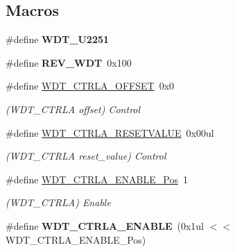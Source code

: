 \subsection*{Macros}
\begin{DoxyCompactItemize}
\item 
\hypertarget{group___s_a_m_l21___w_d_t_ga777d5ca95999852898b8a28793a13b68}{}\#define {\bfseries W\+D\+T\+\_\+\+U2251}\label{group___s_a_m_l21___w_d_t_ga777d5ca95999852898b8a28793a13b68}

\item 
\hypertarget{group___s_a_m_l21___w_d_t_ga2a81abc78d42c7d555d128b152388248}{}\#define {\bfseries R\+E\+V\+\_\+\+W\+D\+T}~0x100\label{group___s_a_m_l21___w_d_t_ga2a81abc78d42c7d555d128b152388248}

\item 
\hypertarget{group___s_a_m_l21___w_d_t_ga03570806578a653a7b3f4ef9588a21a3}{}\#define \hyperlink{group___s_a_m_l21___w_d_t_ga03570806578a653a7b3f4ef9588a21a3}{W\+D\+T\+\_\+\+C\+T\+R\+L\+A\+\_\+\+O\+F\+F\+S\+E\+T}~0x0\label{group___s_a_m_l21___w_d_t_ga03570806578a653a7b3f4ef9588a21a3}

\begin{DoxyCompactList}\small\item\em (W\+D\+T\+\_\+\+C\+T\+R\+L\+A offset) Control \end{DoxyCompactList}\item 
\hypertarget{group___s_a_m_l21___w_d_t_ga6c0fe1613fd8c8330c2da90121786102}{}\#define \hyperlink{group___s_a_m_l21___w_d_t_ga6c0fe1613fd8c8330c2da90121786102}{W\+D\+T\+\_\+\+C\+T\+R\+L\+A\+\_\+\+R\+E\+S\+E\+T\+V\+A\+L\+U\+E}~0x00ul\label{group___s_a_m_l21___w_d_t_ga6c0fe1613fd8c8330c2da90121786102}

\begin{DoxyCompactList}\small\item\em (W\+D\+T\+\_\+\+C\+T\+R\+L\+A reset\+\_\+value) Control \end{DoxyCompactList}\item 
\hypertarget{group___s_a_m_l21___w_d_t_gaa9c995e8a97dca656cabe42986621fa5}{}\#define \hyperlink{group___s_a_m_l21___w_d_t_gaa9c995e8a97dca656cabe42986621fa5}{W\+D\+T\+\_\+\+C\+T\+R\+L\+A\+\_\+\+E\+N\+A\+B\+L\+E\+\_\+\+Pos}~1\label{group___s_a_m_l21___w_d_t_gaa9c995e8a97dca656cabe42986621fa5}

\begin{DoxyCompactList}\small\item\em (W\+D\+T\+\_\+\+C\+T\+R\+L\+A) Enable \end{DoxyCompactList}\item 
\hypertarget{group___s_a_m_l21___w_d_t_ga376b216a1c8def5d940b36a89023f4f1}{}\#define {\bfseries W\+D\+T\+\_\+\+C\+T\+R\+L\+A\+\_\+\+E\+N\+A\+B\+L\+E}~(0x1ul $<$$<$ W\+D\+T\+\_\+\+C\+T\+R\+L\+A\+\_\+\+E\+N\+A\+B\+L\+E\+\_\+\+Pos)\label{group___s_a_m_l21___w_d_t_ga376b216a1c8def5d940b36a89023f4f1}


\end{DoxyCompactItemize}
